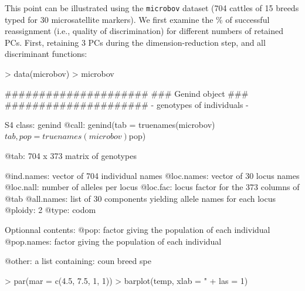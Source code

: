 \documentclass{article}
\begin{document}
This point can be illustrated using the \texttt{microbov} dataset (704 cattles of 15 breeds typed
for 30 microsatellite markers).
We first examine the  \% of successful reassignment (i.e., quality of discrimination) for different numbers of retained PCs.
First, retaining 3 PCs during the dimension-reduction step, and all discriminant functions:
\begin{Schunk}
\begin{Sinput}
> data(microbov)
> microbov
\end{Sinput}
\begin{Soutput}
   #####################
   ### Genind object ### 
   #####################
- genotypes of individuals - 

S4 class:  genind
@call: genind(tab = truenames(microbov)$tab, pop = truenames(microbov)$pop)

@tab:  704 x 373 matrix of genotypes

@ind.names: vector of  704 individual names
@loc.names: vector of  30 locus names
@loc.nall: number of alleles per locus
@loc.fac: locus factor for the  373 columns of @tab
@all.names: list of  30 components yielding allele names for each locus
@ploidy:  2
@type:  codom

Optionnal contents: 
@pop:  factor giving the population of each individual
@pop.names:  factor giving the population of each individual

@other: a list containing: coun  breed  spe 
\end{Soutput}
\end{Schunk}
\begin{Schunk}
\begin{Sinput}
> par(mar = c(4.5, 7.5, 1, 1))
> barplot(temp, xlab = "%
+     las = 1)
\end{Sinput}
\end{Schunk}
\end{document}
